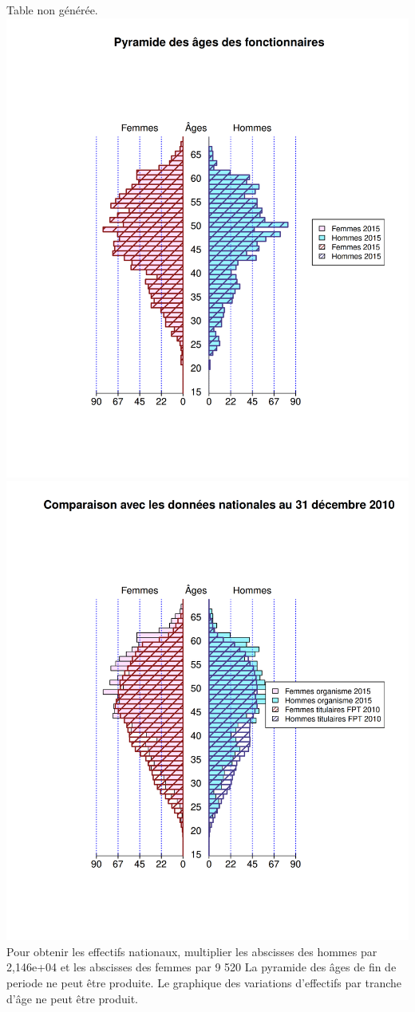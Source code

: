 Table non
générée.\includegraphics{altair_files/figure-latex/unnamed-chunk-17-1.png}
\includegraphics{altair_files/figure-latex/unnamed-chunk-17-2.png} Pour
obtenir les effectifs nationaux, multiplier les abscisses des hommes par
2,146e+04 et les abscisses des femmes par 9 520 La pyramide des âges de
fin de periode ne peut être produite. \newpage Le graphique des
variations d'effectifs par tranche d'âge ne peut être produit.

